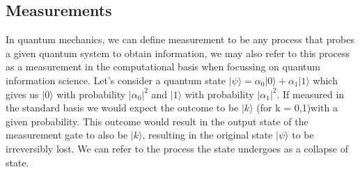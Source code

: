 \documentclass[12pt]{article}
\numberwithin{equation}{section}
\begin{document}
\subsection{Measurements}
In quantum mechanics, we can define measurement to be any process that probes a 
given quantum system to obtain information, we may also refer to this process as 
a measurement in the computational basis when focussing on quantum information 
science. Let's consider a quantum state 
$|\psi \rangle = \alpha_0|0\rangle+\alpha_1|1\rangle$ which gives us $|0\rangle$
with probability $|\alpha_0|^2$ and $|1\rangle$ with probability $|\alpha_1|^2$. 
If measured in the standard basis we would expect the outcome to be $|k\rangle$
(for k = 0,1)with a given probability. This outcome would result in the output 
state of the measurement gate to also be $|k\rangle$, resulting in the original 
state $|\psi\rangle$ to be irreversibly lost. We can refer to the process the state 
undergoes as a collapse of state. 
\end{document}

